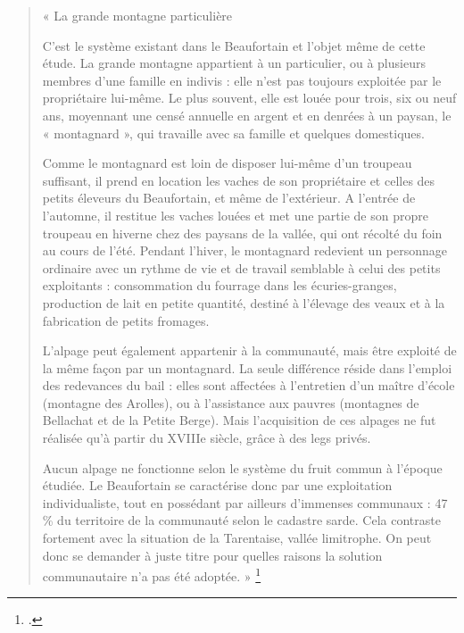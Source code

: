 \documentclass[12pt,a4paper]{report}
\begin{document}
\begin{quote}
	« La grande montagne particulière
	
	C'est le système existant dans le Beaufortain et l'objet même de cette étude. La grande montagne appartient à un particulier, ou à plusieurs membres d'une famille en indivis : elle n'est pas toujours exploitée par le propriétaire lui-même. Le plus souvent, elle est louée pour trois, six ou neuf ans, moyennant une censé annuelle en argent et en denrées à un paysan, le « montagnard », qui travaille avec sa famille et quelques domestiques.
	
	Comme le montagnard est loin de disposer lui-même d'un troupeau suffisant, il prend en location les vaches de son propriétaire et celles des petits éleveurs du Beaufortain, et même de l'extérieur. A l'entrée de l'automne, il restitue les vaches louées et met une partie de son propre troupeau en hiverne chez des paysans de la vallée, qui ont récolté du foin au cours de l'été. Pendant l'hiver, le montagnard redevient un personnage ordinaire avec un rythme de vie et de travail semblable à celui des petits exploitants : consommation du fourrage dans les écuries-granges, production de lait en petite quantité, destiné à l'élevage des veaux et à la fabrication de petits fromages.
	
	L'alpage peut également appartenir à la communauté, mais être exploité de la même façon par un montagnard. La seule différence réside dans l'emploi des redevances du bail : elles sont affectées à l'entretien d'un maître d'école (montagne des Arolles), ou à l'assistance aux pauvres (montagnes de Bellachat et de la Petite Berge). Mais l'acquisition de ces alpages ne fut réalisée qu'à partir du XVIIIe siècle, grâce à des legs privés.
	
	Aucun alpage ne fonctionne selon le système du fruit commun à l'époque étudiée. Le Beaufortain se caractérise donc par une exploitation individualiste, tout en possédant par ailleurs d'immenses communaux : 47 \% du territoire de la communauté selon le cadastre sarde. Cela contraste fortement avec la situation de la Tarentaise, vallée limitrophe. On peut donc se demander à juste titre pour quelles raisons la solution communautaire n'a pas été adoptée. »
	\footcite[48]{HViallet1993}
\end{quote}
\end{document}
